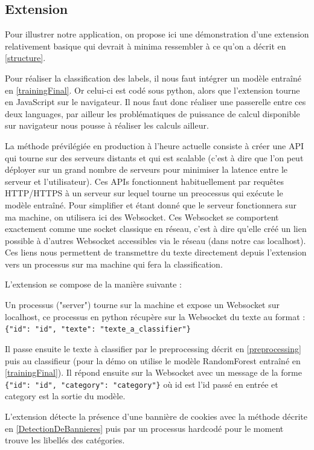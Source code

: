 \documentclass[oneside,a4paper,12pt]{article}
\begin{document}
	\subsection{Extension}
	Pour illustrer notre application, on propose ici une démonstration d'une extension relativement basique qui devrait à minima ressembler à ce qu'on a décrit en \ref{structure}.
	
	Pour réaliser la classification des labels, il nous faut intégrer un modèle entraîné en \ref{trainingFinal}. Or celui-ci est codé sous python, alors que l'extension tourne en JavaScript sur le navigateur. 
	Il nous faut donc réaliser une passerelle entre ces deux languages, par ailleur les problématiques de puissance de calcul disponible sur navigateur nous pousse à réaliser les calculs ailleur.
	
	La méthode prévilégiée en production à l'heure actuelle consiste à créer une API qui tourne sur des serveurs distants et qui est scalable (c'est à dire que l'on peut déployer sur un grand nombre de serveurs pour minimiser la latence entre le serveur et l'utilisateur). Ces APIs fonctionnent habituellement par requêtes HTTP/HTTPS à un serveur sur lequel tourne un preocessus qui exécute le modèle entraîné.
	Pour simplifier et étant donné que le serveur fonctionnera sur ma machine, on utilisera ici des Websocket. Ces Websocket se comportent exactement comme une socket classique en réseau, c'est à dire qu'elle créé un lien possible à d'autres Websocket accessibles via le réseau (dans notre cas localhost). Ces liens nous permettent de transmettre du texte directement depuis l'extension vers un processus sur ma machine qui fera la classification.
	
	L'extension se compose de la manière suivante :
	
	Un processus ("server") tourne sur la machine et expose un Websocket sur localhost, ce processus en python récupère sur la Websocket du texte au format : \lstinline|{"id": "id", "texte": "texte_a_classifier"}|
	
	Il passe ensuite le texte à classifier par le preprocessing décrit en \ref{preprocessing} puis au classifieur (pour la démo on utilise le modèle RandomForest entraîné en \ref{trainingFinal}). Il répond ensuite sur la Websocket avec un message de la forme \lstinline|{"id": "id", "category": "category"}| o\`u id est l'id passé en entrée et category est la sortie du modèle.
	
	L'extension détecte la présence d'une bannière de cookies avec la méthode décrite en \ref{DetectionDeBannieres} puis par un processus hardcodé pour le moment trouve les libellés des catégories.
	
\end{document}

